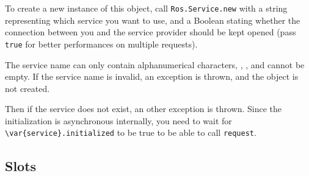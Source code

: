 To create a new instance of this object, call \lstinline{Ros.Service.new}
with a string representing which service you want to use, and a Boolean
stating whether the connection between you and the service provider should
be kept opened (pass \lstinline{true} for better performances on multiple
requests).

The service name can only contain alphanumerical characters, \samp{/},
\samp{\_}, and cannot be empty. If the service name is invalid, an exception
is thrown, and the object is not created.

Then if the service does not exist, an other exception is thrown. Since the
initialization is asynchronous internally, you need to wait for
\lstinline|\var{service}.initialized| to be true to be able to call
\lstinline{request}.


\subsection{Slots}


